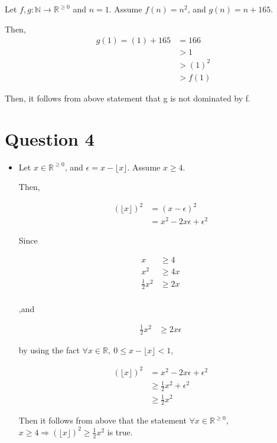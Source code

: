 \documentclass[12pt]{article}
\begin{document}
\begin{enumerate}[a.]
    \bigskip

    Let $f,g:\mathbb{N} \to \mathbb{R}^{\geq 0}$ and $n = 1$. Assume $f(n) = n^2$,
    and $g(n) = n + 165$.

    \bigskip

    Then,
    \setcounter{equation}{0}
    \begin{align}
        g(1) = (1) + 165 &= 166\\
        &> 1\\
        &>(1)^2\\
        &> f(1)
    \end{align}

    \bigskip

    Then, it follows from above statement that g is not dominated by f.

\end{enumerate}

\section*{Question 4}
\begin{itemize}
    \item

    Let $x \in \mathbb{R}^{\geq 0}$, and $\epsilon = x - \lfloor x \rfloor$.
    Assume $x \geq 4$.

    \bigskip

    Then,

    \setcounter{equation}{0}
    \begin{align}
        (\lfloor x \rfloor)^2 &= (x - \epsilon)^2\\
        &= x^2 - 2x\epsilon + \epsilon^2
    \end{align}

    \bigskip

    Since

    \begin{align}
        x &\geq 4\\
        x^2 &\geq 4x\\
        \frac{1}{2}x^2 &\geq 2x\\
    \end{align}

    ,and

    \begin{align}
        \frac{1}{2}x^2 &\geq 2x\epsilon
    \end{align}

    by using the fact $\forall x \in \mathbb{R},\: 0 \leq x - \lfloor x \rfloor < 1$,

    \begin{align}
        (\lfloor x \rfloor)^2 &= x^2 - 2x\epsilon + \epsilon^2\\
        &\geq \frac{1}{2}x^2 + \epsilon^2\\
        &\geq \frac{1}{2}x^2
    \end{align}

    \bigskip

    Then it follows from above that the statement $\forall x \in \mathbb{R}^{\geq 0}$,
    $x \geq 4 \Rightarrow (\lfloor x \rfloor)^2 \geq \frac{1}{2}x^2$ is true.

\end{itemize}
\end{document}
